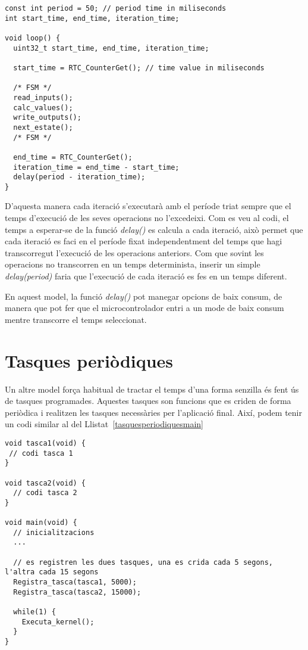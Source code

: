 \begin{lstlisting}[style=customc,caption={FSM amb control del temps},label=FSM_temps]
const int period = 50; // period time in miliseconds
int start_time, end_time, iteration_time;

void loop() {
  uint32_t start_time, end_time, iteration_time;
  
  start_time = RTC_CounterGet(); // time value in miliseconds
  
  /* FSM */
  read_inputs();
  calc_values();
  write_outputs();
  next_estate();
  /* FSM */
  
  end_time = RTC_CounterGet();
  iteration_time = end_time - start_time;
  delay(period - iteration_time);
}
\end{lstlisting}

D'aquesta manera cada iteració s'executarà amb el període triat sempre que el temps d'execució de les seves operacions no l'excedeixi. Com es veu al codi, el temps a esperar-se de la funció {\em delay()} es calcula a cada iteració, això permet que cada iteració es faci en el període fixat independentment del temps que hagi transcorregut l'execució de les operacions anteriors. Com que sovint les operacions no transcorren en un temps determinista, inserir un simple {\em delay(period)} faria que l'execució de cada iteració es fes en un temps diferent.

En aquest model, la funció {\em delay()} pot manegar opcions de baix consum, de manera que pot fer que el microcontrolador entri a un mode de baix consum mentre transcorre el temps seleccionat.

\section{Tasques periòdiques}
\label{sec:tasquesperiodiques}

Un altre model força habitual de tractar el temps d'una forma senzilla és fent ús de tasques programades. Aquestes tasques son funcions que es criden de forma periòdica i realitzen les tasques necessàries per l'aplicació final. Així, podem tenir un codi similar al del Llistat~\ref{tasquesperiodiquesmain}

\begin{lstlisting}[style=customc,caption={Estructura bàsica de les tasques programades},label=tasquesperiodiquesmain]
void tasca1(void) {
 // codi tasca 1
}

void tasca2(void) {
  // codi tasca 2
}

void main(void) {
  // inicialitzacions
  ...
  
  // es registren les dues tasques, una es crida cada 5 segons, l'altra cada 15 segons
  Registra_tasca(tasca1, 5000);
  Registra_tasca(tasca2, 15000);

  while(1) {
    Executa_kernel();
  }
}
\end{lstlisting}


